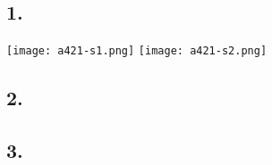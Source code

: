 \subsection{1.}
\texttt{[image: a421-s1.png]}
\texttt{[image: a421-s2.png]}

\subsection{2.}

\subsection{3.}

